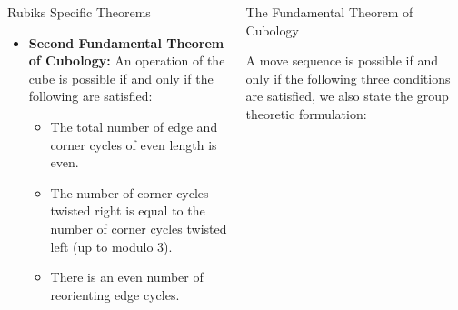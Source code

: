 \documentclass[final]{beamer}
\newlength{\colwidth}
\begin{document}
\begin{frame}[t]
\begin{columns}[t]
\begin{column}{\colwidth}
\begin{exampleblock}{Rubiks Specific Theorems}
\begin{itemize}
      \item \textbf{Second Fundamental Theorem of Cubology: }
      An operation of the cube is possible if and only if the following are satisfied:
            \begin{itemize}
              \item The total number of edge and corner cycles of even length is even.
              \item The number of corner cycles twisted right is equal to the number of corner cycles twisted left (up to modulo 3).
              \item There is an even number of reorienting edge cycles.
            \end{itemize}








    \end{itemize}

  \end{exampleblock}
\end{column}

\begin{column}{\colwidth}

  \begin{alertblock}{The Fundamental Theorem of Cubology}
    
    A move sequence is possible if and only if the following three conditions are satisfied, we also state the group theoretic formulation:


\end{alertblock}
\end{column}
\end{columns}
\end{frame}
\end{document}
